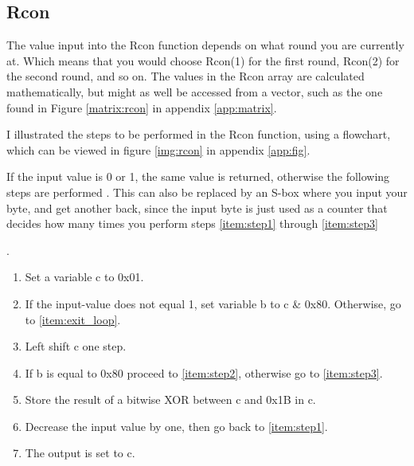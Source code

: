 \subsection{Rcon} \label{ch:Rcon}
The value input into the Rcon function depends on what round you are 
currently at. Which means that you would choose Rcon(1) for the first 
round, Rcon(2) for the second round, and so on. The values in the Rcon 
array are calculated mathematically, but might as well be accessed from 
a vector, such as the one found in Figure \ref{matrix:rcon} in 
appendix \ref{app:matrix}.

I illustrated the steps to be performed in the Rcon function, using a 
flowchart, which can be viewed in figure \ref{img:rcon} in appendix 
\ref{app:fig}.

If the input value is 0 or 1, the same value is returned, otherwise the 
following steps are performed \citep{RijndaelKeySchedule}. This can 
also be replaced by an S-box where you input your byte, and get another 
back, since the input byte is just used as a counter that decides how 
many times you perform steps \ref{item:step1} through \ref{item:step3} 

.

\begin{enumerate}
\item Set a variable c to 0x01.
\item If the input-value does not equal 1, set variable b to c \& 0x80. 
  Otherwise, go to \ref{item:exit_loop}. 
  \label{item:step1}
\item Left shift c one step.
\item If b is equal to 0x80 proceed to \ref{item:step2}, otherwise go to
  \ref{item:step3}.
\item Store the result of a bitwise XOR between c and 0x1B in c.
  \label{item:step2}
\item Decrease the input value by one, then go back to  
  \ref{item:step1}.
  \label{item:step3}
\item The output is set to c.
  \label{item:exit_loop}
\end{enumerate}
